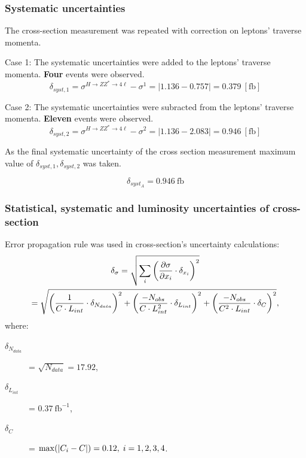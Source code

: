 \documentclass[aspectratio=1610, english]{beamer}
\newcommand{\hzz}{ H\rightarrow ZZ^{*}\rightarrow 4 \ell}
\begin{document}
\begin{frame}
\frametitle{Systematic uncertainties}
The cross-section measurement was repeated with correction on leptons' traverse momenta.\\
\vspace{0.5cm}

Case 1: The systematic uncertainties were added to the leptons' traverse momenta.
\textbf{Four} events were observed.
\begin{equation}
\delta_{syst, 1} = \sigma^{\hzz} - \sigma^1 = | 1.136 - 0.757 | = 0.379 \: [\mathrm{fb}]
\end{equation}

Case 2: The systematic uncertainties were subracted from the leptons' traverse momenta.
\textbf{Eleven} events were observed.
\begin{equation}
\delta_{syst, 2} = \sigma^{\hzz} - \sigma^2 = | 1.136 - 2.083 | = 0.946 \: [\mathrm{fb}]
\end{equation}

As the final systematic uncertainty of the cross section measurement maximum value of $\delta_{syst, 1}, \delta_{syst, 2}$ was taken.

\begin{equation}
\delta_{syst_A} = 0.946 \: \mathrm{fb}
\end{equation}

\end{frame}

\begin{frame}
\frametitle{Statistical, systematic and luminosity uncertainties of cross-section}
Error propagation rule was used in cross-section's uncertainty calculations:
\begin{equation}
\begin{gathered}
\delta_{\sigma}= \sqrt{\sum_i \qty ( \pdv{\sigma}{x_i}\cdot \delta_{x_i} )^2} \\
= \sqrt{\qty( \frac{1}{C\cdot L_{int}}\cdot \delta_{N_{data}})^2 + \qty( \frac{-N_{obs}}{C\cdot L_{int}^2}\cdot \delta_{L_{int}})^2 + \qty( \frac{-N_{obs}}{C^2\cdot L_{int}}\cdot \delta_{C})^2 } ,
\end{gathered}
\end{equation}
where:
\begin{description}
\item[$\delta_{N_{data}}$] = $\sqrt{N_{data}}=17.92$,
\item[$\delta_{L_{int}}$] = $0.37 \: \mathrm{fb}^{-1}$,
\item[$\delta_C$] = $\max(\abs{C_i-C})=0.12, \; i=1, 2, 3, 4$.
\end{description}
\vspace{1cm}

\end{frame}
\end{document}
